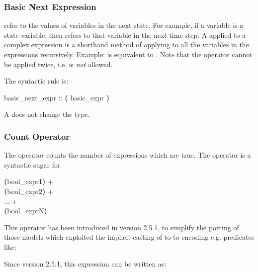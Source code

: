 \subsubsection{Basic Next Expression}
\label{Basic Next Expression}

 refer to the values of variables in the next
state.
%
For example, if a variable  is a state variable, then
 refers to that variable  in
the next time step.
%
A  applied to a complex expression is a
shorthand method of applying  to all the variables in
the expressions recursively.
%
Example:  is equivalent to
.
%
Note that the  operator cannot be applied twice, i.e.
 is \emph{not} allowed.

The syntactic rule is:

\begin{Grammar}
basic_next_expr ::  \textbf{(} basic_expr \textbf{)}
\end{Grammar}
%
A  does not change the type.

\subsubsection{Count Operator}
\label{count operator}
The  operator counts the number of expressions
which are true. 
%
The  operator is a syntactic sugar for
\begin{Grammar}
     \textbf{(}bool_expr1\textbf{)} +\\
     \textbf{(}bool_expr2\textbf{)} +\\
     ... +\\
     \textbf{(}bool_exprN\textbf{)}
\end{Grammar}
%
This operator has been introduced in version 2.5.1, to simplify
the porting of those models which exploited the implicit casting
of \Integer to \Boolean to encoding e.g. predicates like:

%
Since version 2.5.1, this expression can be written as:



